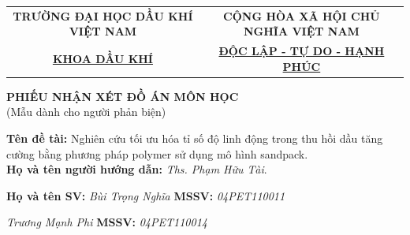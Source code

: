 \documentclass[12pt,a4paper]{article}
\begin{document}
\newpage
\begin{table}[h]
\centering
\label{my-label}
\begin{tabular}{cc}
 \textbf{TRƯỜNG ĐẠI HỌC DẦU KHÍ VIỆT NAM} & \textbf{CỘNG HÒA XÃ HỘI CHỦ NGHĨA VIỆT NAM} \\
 \underline{\textbf{KHOA DẦU KHÍ}}& \underline{\textbf{ĐỘC LẬP - TỰ DO - HẠNH PHÚC}}
\end{tabular}
\end{table}
\begin{center}
	\centering
	\textbf{PHIẾU NHẬN XÉT ĐỒ ÁN MÔN HỌC}\\
	(Mẫu dành cho người phản biện)
\end{center}
\textbf{Tên đề tài:} Nghiên cứu tối ưu hóa tỉ số độ linh động trong thu hồi dầu tăng cường bằng phương pháp polymer sử dụng mô hình sandpack.\\
\textbf{Họ và tên người hướng dẫn:} \textit{Ths. Phạm Hữu Tài}.

\textbf{Họ và tên SV:} \textit{Bùi Trọng Nghĩa} \hspace{98pt} \textbf{MSSV:} \textit{04PET110011} 

\hspace{68pt} \textit{Trương Mạnh Phi} \hspace{95pt} \textbf{MSSV:} \textit{04PET110014}
\end{document}
